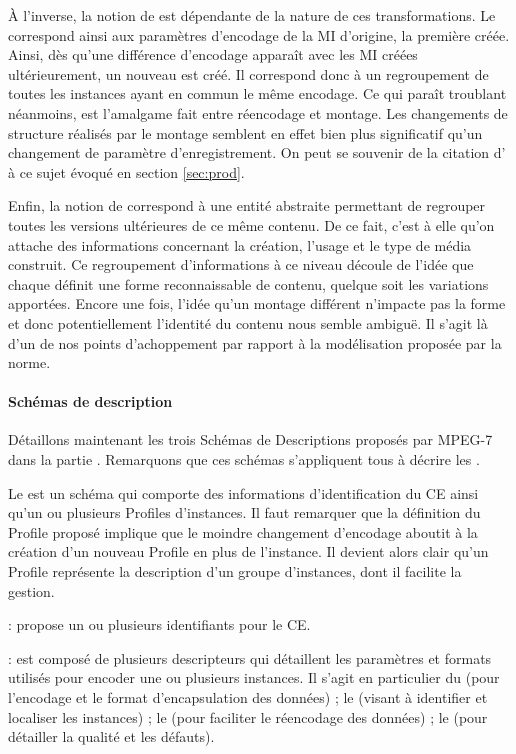 À l'inverse, la notion de  est dépendante de la nature de ces transformations. 
Le  correspond ainsi aux paramètres d'encodage de la MI d'origine, la première créée. 
Ainsi, dès qu'une différence d'encodage apparaît avec les MI créées ultérieurement, un nouveau  est créé. 
Il correspond donc à un regroupement de toutes les instances ayant en commun le même encodage. 
Ce qui paraît troublant néanmoins, est l'amalgame fait entre réencodage et montage. 
Les changements de structure réalisés par le montage semblent en effet bien plus significatif qu'un changement de paramètre d'enregistrement. 
On peut se souvenir de la citation d' à ce sujet évoqué en section \ref{sec:prod}.

Enfin, la notion de  correspond à une entité abstraite permettant de regrouper toutes les versions ultérieures de ce même contenu.
De ce fait, c'est à elle qu'on attache des informations concernant la création, l'usage et le type de média construit. %
Ce regroupement d'informations à ce niveau découle de l'idée que chaque  définit une forme reconnaissable de contenu, quelque soit les variations apportées.
Encore une fois, l'idée qu'un montage différent n'impacte pas la forme et donc potentiellement l'identité du contenu nous semble ambiguë. 
Il s'agit là d'un de nos points d'achoppement par rapport à la modélisation proposée par la norme. 

\paragraph{Schémas de description}
Détaillons maintenant les trois Schémas de Descriptions proposés par MPEG-7 dans la partie .
Remarquons que ces schémas s'appliquent tous à décrire les .

Le  est un schéma qui comporte des informations d'identification du CE ainsi qu'un ou plusieurs Profiles d'instances. 
Il faut remarquer que la définition du Profile proposé implique que le moindre changement d'encodage aboutit à la création d'un nouveau Profile en plus de l'instance. 
Il devient alors clair qu'un Profile représente la description d'un groupe d'instances, dont il facilite la gestion.
\begin{liste}
	\item {} : propose un ou plusieurs identifiants pour le CE.
	\item {} : est composé de plusieurs descripteurs qui détaillent les paramètres et formats utilisés pour encoder une ou plusieurs instances.
	Il s'agit en particulier du  (pour l'encodage et le format d'encapsulation des données) ; le  (visant à identifier et localiser les instances) ; le  (pour faciliter le réencodage des données) ; le  (pour détailler la qualité et les défauts). 
\end{liste}


